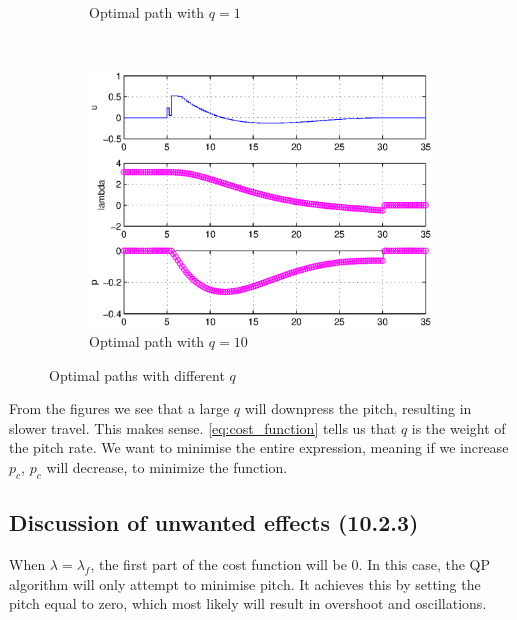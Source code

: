 \begin{figure}[H]
\begin{subfigure}[b]{0.5\textwidth}
                \caption{Optimal path with $q = 1$}
                \label{fig:estimatedDay202}
        \end{subfigure}
        ~ 
        \begin{subfigure}[b]{0.5\textwidth}
                \includegraphics[width=\textwidth]{day2q10}
                \caption{Optimal path with $q = 10$}
                \label{fig:estimatedDay203}
        \end{subfigure}
        \caption{Optimal paths with different $q$}\label{fig:animals}
\end{figure}



From the figures we see that a large $q$ will downpress the pitch, resulting in slower travel. This makes sense. \eqref{eq:cost_function} tells us that $q$ is the weight of the pitch rate. We want to minimise the entire expression, meaning if we increase $p_c$, $p_c$ will decrease, to minimize the function.

\subsection{Discussion of unwanted effects (10.2.3)\label{unwanted}}
When $\lambda = \lambda_f$, the first part of the cost function will be 0. In this case, the QP algorithm will only attempt to minimise pitch. It achieves this by setting the pitch equal to zero, which most likely will result in overshoot and oscillations.


